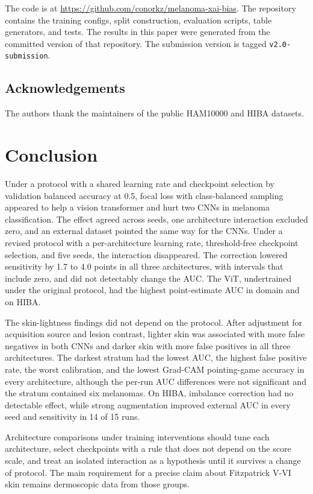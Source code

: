 \documentclass[11pt]{article}
\begin{document}
The code is at \url{https://github.com/conorkz/melanoma-xai-bias}. The repository contains the training configs, split construction, evaluation scripts, table generators, and tests. The results in this paper were generated from the committed version of that repository. The submission version is tagged \texttt{v2.0-submission}.

\subsection*{Acknowledgements}

The authors thank the maintainers of the public HAM10000 and HIBA datasets.
\fi

\section{Conclusion}

Under a protocol with a shared learning rate and checkpoint selection by validation balanced accuracy at 0.5, focal loss with class-balanced sampling appeared to help a vision transformer and hurt two CNNs in melanoma classification. The effect agreed across seeds, one architecture interaction excluded zero, and an external dataset pointed the same way for the CNNs. Under a revised protocol with a per-architecture learning rate, threshold-free checkpoint selection, and five seeds, the interaction disappeared. The correction lowered sensitivity by 1.7 to 4.0 points in all three architectures, with intervals that include zero, and did not detectably change the AUC. The ViT, undertrained under the original protocol, had the highest point-estimate AUC in domain and on HIBA.

The skin-lightness findings did not depend on the protocol. After adjustment for acquisition source and lesion contrast, lighter skin was associated with more false negatives in both CNNs and darker skin with more false positives in all three architectures. The darkest stratum had the lowest AUC, the highest false positive rate, the worst calibration, and the lowest Grad-CAM pointing-game accuracy in every architecture, although the per-run AUC differences were not significant and the stratum contained six melanomas. On HIBA, imbalance correction had no detectable effect, while strong augmentation improved external AUC in every seed and sensitivity in 14 of 15 runs.

Architecture comparisons under training interventions should tune each architecture, select checkpoints with a rule that does not depend on the score scale, and treat an isolated interaction as a hypothesis until it survives a change of protocol. The main requirement for a precise claim about Fitzpatrick V-VI skin remains dermoscopic data from those groups.
\end{document}
